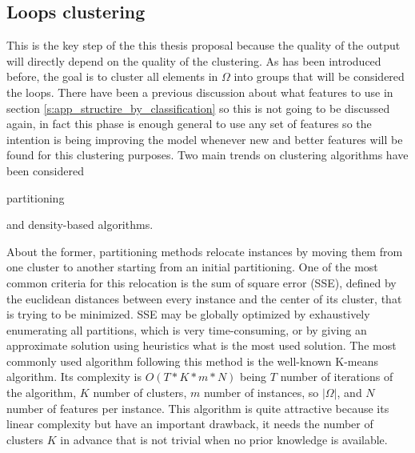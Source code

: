 \subsection{Loops clustering}\label{ss:loops_clustering}

This is the key step of the this thesis proposal because the quality of the
output will directly depend on the quality of the clustering. As has been introduced
before, the goal is to cluster all elements in $\Omega$ into groups that will be
considered the loops. There have been a previous discussion about what features
to use in section \ref{s:app_structire_by_classification} so this is not going to be
discussed again, in fact this phase is enough general to use any set of
features so the intention is being improving the model whenever new and better
features will be found for this clustering purposes. Two main trends on 
clustering algorithms have been considered \cite{rokach2005clustering}
\begin{enumerate*}[label=\roman*)]
  \item partitioning
  \item and density-based algorithms.
\end{enumerate*} 

About the former, partitioning methods relocate instances by moving them from
one cluster to another starting from an initial partitioning.
One of the most common criteria for this relocation is the sum of square error
(SSE), defined by the euclidean distances between every instance and the center
of its cluster, that is trying to be minimized. SSE may be globally optimized by 
exhaustively enumerating all partitions, which is very time-consuming, 
or by giving an approximate solution using heuristics what is the most used
solution. The most commonly used algorithm following this method is the 
well-known K-means algorithm. Its complexity is $O(T*K*m*N)$ being $T$ number of
iterations of the algorithm, $K$ number of clusters, $m$ number of instances, so
$|\Omega|$, and $N$ number of features per instance. This algorithm is quite attractive because
its linear complexity but have an important drawback, it needs the number of
clusters $K$ in advance that is not trivial when no prior knowledge is
available.

